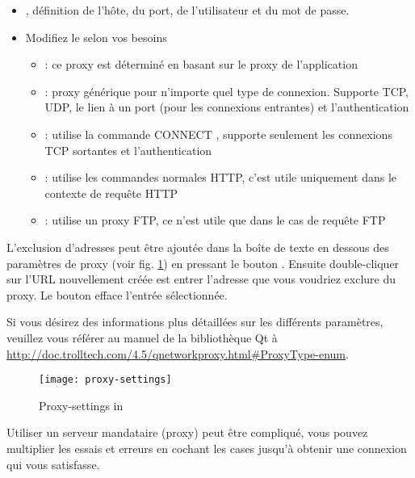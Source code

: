 {\setlength{\baselineskip}{1.4\baselineskip}
\begin{itemize}[label=--]
\item {}, définition de l'hôte, du port, de l'utilisateur et du mot de passe.
\item Modifiez le  selon vos besoins
 \begin{itemize}[label=--,itemsep=2pt]
  \item {}: ce proxy est déterminé en basant sur le proxy de l'application
  \item {}: proxy générique pour n'importe quel type de connexion. Supporte TCP, UDP, le lien à un port (pour les connexions entrantes) et l'authentication
  \item {}: utilise la commande \og CONNECT \fg, supporte seulement les connexions TCP sortantes et l'authentication
  \item {}: utilise les commandes normales HTTP, c'est utile uniquement dans le contexte de requête HTTP
  \item {}: utilise un proxy FTP, ce n'est utile que dans le cas de requête FTP
\end{itemize}
\end{itemize}}
L'exclusion d'adresses peut être ajoutée dans la boîte de texte en dessous des paramètres de proxy (voir fig. \ref{fig:proxy-settings}) en pressant le bouton . Ensuite double-cliquer sur l'URL nouvellement créée est entrer l'adresse que vous voudriez exclure du proxy. Le bouton  efface l'entrée sélectionnée.

Si vous désirez des informations plus détaillées sur les différents paramètres, veuillez vous référer au manuel de la bibliothèque Qt à \url{http://doc.trolltech.com/4.5/qnetworkproxy.html#ProxyType-enum}.

\begin{figure}[ht]
   \begin{center}
   \texttt{[image: proxy-settings]}
   \caption{Proxy-settings in \qg \nixcaption}
   \label{fig:proxy-settings}
\end{center} 
\end{figure}

\begin{Tip} \caption{\textsc{Utiliser un proxy}}
Utiliser un serveur mandataire (proxy) peut être compliqué, vous pouvez multiplier les essais et erreurs en cochant les cases jusqu'à obtenir une connexion qui vous satisfasse.
\end{Tip}

